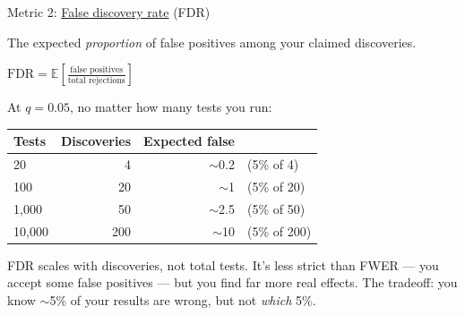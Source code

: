 \documentclass[aspectratio=169,11pt]{beamer}
\begin{document}
\begin{frame}{Metric 2: \href{https://en.wikipedia.org/wiki/False_discovery_rate}{False discovery rate} (FDR)}

{\small The expected \emph{proportion} of false positives among your claimed discoveries.}

\vspace{0.5em}

\begin{center}
$\text{FDR} = \mathbb{E}\left[\frac{\text{false positives}}{\text{total rejections}}\right]$
\end{center}

\vspace{0.5em}

{\small At $q = 0.05$, no matter how many tests you run:}

\vspace{0.3em}

{\small
\begin{tabular}{lrrl}
\toprule
\textbf{Tests} & \textbf{Discoveries} & \textbf{Expected false} & \\
\midrule
20 & 4 & $\sim$0.2 & (5\% of 4) \\
100 & 20 & $\sim$1 & (5\% of 20) \\
1,000 & 50 & $\sim$2.5 & (5\% of 50) \\
10,000 & 200 & $\sim$10 & (5\% of 200) \\
\bottomrule
\end{tabular}
}

\vspace{0.5em}

{\small FDR scales with discoveries, not total tests. It's less strict than FWER --- you accept some false positives --- but you find far more real effects. The tradeoff: you know $\sim$5\% of your results are wrong, but not \emph{which} 5\%.}
\end{frame}
\end{document}
